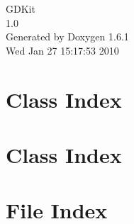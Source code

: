 \documentclass[a4paper]{book}
\begin{document}
\hypersetup{pageanchor=false}
\begin{titlepage}
\vspace*{7cm}
\begin{center}
{\Large GDKit \\[1ex]\large 1.0 }\\
\vspace*{1cm}
{\large Generated by Doxygen 1.6.1}\\
\vspace*{0.5cm}
{\small Wed Jan 27 15:17:53 2010}\\
\end{center}
\end{titlepage}
\clearemptydoublepage
{}
\tableofcontents
\clearemptydoublepage
{}
\hypersetup{pageanchor=true}
\chapter{Class Index}

\chapter{Class Index}

\chapter{File Index}

\end{document}
